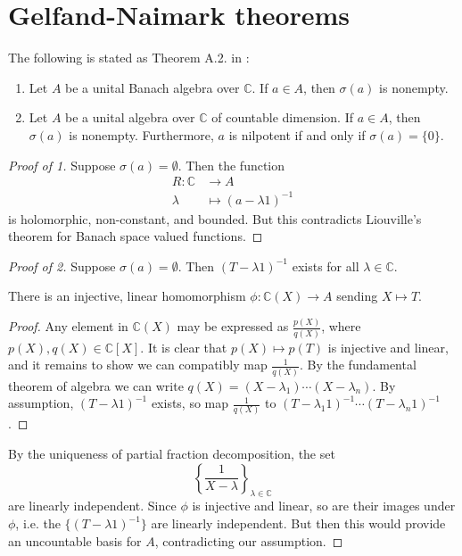 \documentclass[12pt]{article}
\begin{document}

\section{Gelfand-Naimark theorems} %
\begin{refsection}

The following is stated as Theorem A.2. in \cite{khalkhali_book}:
\begin{theorem}
	\hfill
	\begin{enumerate}
		\item Let $A$ be a unital Banach algebra over $\mathbb{C}$. If $a\in A$, then $\sigma(a)$ is nonempty.
		\item Let $A$ be a unital algebra over $\mathbb{C}$ of countable dimension. If $a\in A$, then $\sigma(a)$ is nonempty. Furthermore, $a$ is nilpotent if and only if $\sigma(a)=\{0\}$.
	\end{enumerate}
\end{theorem}
\begin{proof}[Proof of 1]
	Suppose $\sigma(a)=\emptyset$. Then the function 
	\begin{align*}
		R:\mathbb{C} &\to A \\
		\lambda &\mapsto (a-\lambda 1)^{-1}
	\end{align*}
	is holomorphic, non-constant, and bounded. But this contradicts Liouville's theorem for Banach space valued functions.
\end{proof}
\begin{proof}[Proof of 2]
	Suppose $\sigma(a)=\emptyset$. Then $(T-\lambda 1)^{-1}$ exists for all $\lambda\in \mathbb{C}$.

	\begin{claim}
		There is an injective, linear homomorphism $\phi:\mathbb{C}(X) \to A$ sending $X\mapsto T$.
	\end{claim}
	\begin{proof}
		Any element in $\mathbb{C}(X)$ may be expressed as $\frac{p(X)}{q(X)}$, where $p(X),q(X)\in\mathbb{C}[X]$. It is clear that $p(X)\mapsto p(T)$ is injective and linear, and it remains to show we can compatibly map $\frac{1}{q(X)}$. By the fundamental theorem of algebra we can write $q(X)=(X-\lambda_1)\cdots (X-\lambda_n)$. By assumption, $(T-\lambda 1)^{-1}$ exists, so map $\frac{1}{q(X)}$ to $(T-\lambda_1 1)^{-1}\cdots (T-\lambda_n 1)^{-1}$. 
	\end{proof}

	By the uniqueness of partial fraction decomposition, the set 
	\begin{equation*}
		\left\{\frac{1}{X-\lambda}\right\}_{\lambda\in\mathbb{C}}
	\end{equation*}
	are linearly independent. Since $\phi$ is injective and linear, so are their images under $\phi$, i.e. the $\{(T-\lambda 1)^{-1}\}$ are linearly independent. But then this would provide an uncountable basis for $A$, contradicting our assumption.
\end{proof}


\printbibliography
\end{refsection}
\end{document}
